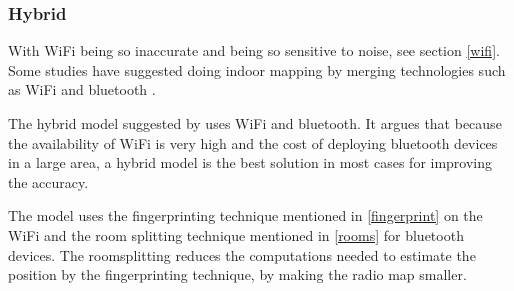 \subsubsection{Hybrid}
With WiFi being so inaccurate and being so sensitive to noise, see section \ref{wifi}.
Some studies have suggested doing indoor mapping by merging technologies such as WiFi and bluetooth \cite{hybrid_wifi_bluetooth} \cite{fusion_wifi_bluetooth}.

The hybrid model suggested by \citet{hybrid_wifi_bluetooth} uses WiFi and bluetooth.
It argues that because the availability of WiFi is very high and the cost of deploying bluetooth devices in a large area, a hybrid model is the best solution in most cases for improving the accuracy.


The model uses the fingerprinting technique mentioned in \cref{fingerprint}  on the WiFi and the room splitting technique mentioned in \cref{rooms} for bluetooth devices.
The roomsplitting reduces the computations needed to estimate the position by the fingerprinting technique, by making the radio map smaller.